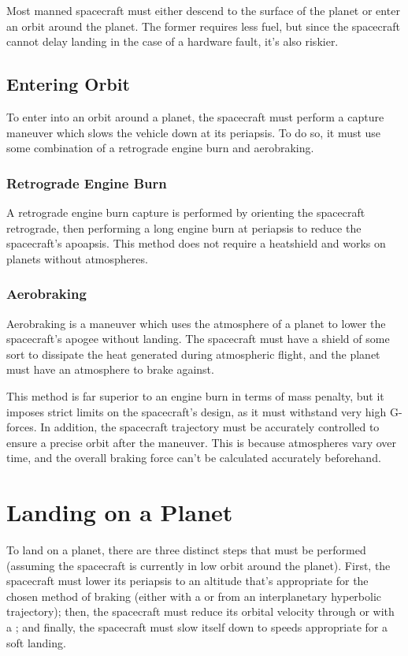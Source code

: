 Most manned spacecraft must either descend to the surface of the
planet or enter an orbit around the planet. The former requires less
fuel, but since the spacecraft cannot delay landing in the case of a
hardware fault, it's also riskier.

\subsection{Entering Orbit}

To enter into an orbit around a planet, the spacecraft must perform a
capture maneuver which slows the vehicle down at its periapsis. To do
so, it must use some combination of a retrograde engine burn and
aerobraking.

\subsubsection{Retrograde Engine Burn}

A retrograde engine burn capture is performed by orienting the
spacecraft retrograde, then performing a long engine burn at periapsis
to reduce the spacecraft's apoapsis. This method does not require a
heatshield and works on planets without atmospheres.

\subsubsection{Aerobraking}

Aerobraking is a maneuver which uses the atmosphere of a planet to
lower the spacecraft's apogee without landing. The spacecraft must
have a shield of some sort to dissipate the heat generated during
atmospheric flight, and the planet must have an atmosphere to brake
against.

This method is far superior to an engine burn in terms of mass
penalty, but it imposes strict limits on the spacecraft's design, as
it must withstand very high G-forces. In addition, the spacecraft
trajectory must be accurately controlled to ensure a precise orbit
after the maneuver. This is because atmospheres vary over time, and
the overall braking force can't be calculated accurately beforehand.

\section{Landing on a Planet}

To land on a planet, there are three distinct steps that must be
performed (assuming the spacecraft is currently in low orbit around
the planet).
%
First, the spacecraft must lower its periapsis to an altitude that's
appropriate for the chosen method of braking (either with a
 or from an interplanetary
hyperbolic trajectory);
%
then, the spacecraft must reduce its orbital velocity through
 or with a
;
%
and finally, the spacecraft must slow itself down to speeds
appropriate for a soft landing.

